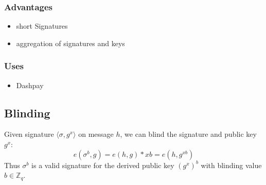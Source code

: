 \documentclass[a4paper,12pt]{scrartcl}
\begin{document}
\subsubsection{Advantages}
\begin{itemize}
	\item short Signatures
	\item aggregation of signatures and keys
\end{itemize}

\subsubsection{Uses}
\begin{itemize}
	\item Dashpay
\end{itemize}

\subsection{Blinding}
Given signature \( \langle \sigma, g^x \rangle \) on message \( h \), we can blind the signature and public key \( g^x \):
\[ e(\sigma^b,g) = e(h,g)*{xb} = e(h,g^{xb}) \]
Thus \( \sigma^b \) is a valid signature for the derived public key \( (g^x)^b \) with blinding value \( b \in \mathbb{Z}_{q} \).\cite[PKI Slide 12]{crypto-slides-grothoff}
\pagebreak

\printbibliography
\end{document}
